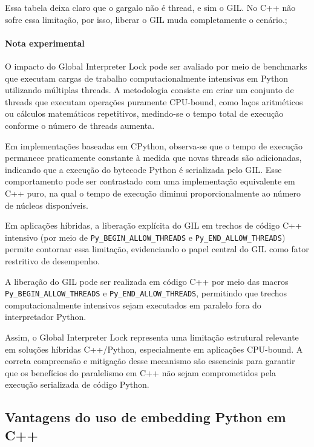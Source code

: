 Essa tabela deixa claro que o gargalo não é thread, e sim o GIL. No C++ não sofre essa limitação, por isso, liberar o GIL muda completamente o cenário.;

\paragraph{Nota experimental}

O impacto do Global Interpreter Lock pode ser avaliado por meio de benchmarks que executam cargas de trabalho computacionalmente intensivas em Python utilizando múltiplas threads. A metodologia consiste em criar um conjunto de threads que executam operações puramente CPU-bound, como laços aritméticos ou cálculos matemáticos repetitivos, medindo-se o tempo total de execução conforme o número de threads aumenta.

Em implementações baseadas em CPython, observa-se que o tempo de execução permanece praticamente constante à medida que novas threads são adicionadas, indicando que a execução do bytecode Python é serializada pelo GIL. Esse comportamento pode ser contrastado com uma implementação equivalente em C++ puro, na qual o tempo de execução diminui proporcionalmente ao número de núcleos disponíveis.

Em aplicações híbridas, a liberação explícita do GIL em trechos de código C++ intensivo (por meio de \texttt{Py\_BEGIN\_ALLOW\_THREADS} e \texttt{Py\_END\_ALLOW\_THREADS}) permite contornar essa limitação, evidenciando o papel central do GIL como fator restritivo de desempenho.

A liberação do GIL pode ser realizada em código C++ por meio das macros\\
\texttt{Py\_BEGIN\_ALLOW\_THREADS} e \texttt{Py\_END\_ALLOW\_THREADS},
permitindo que trechos computacionalmente intensivos sejam executados em paralelo fora do interpretador Python.

Assim, o Global Interpreter Lock representa uma limitação estrutural relevante em soluções híbridas C++/Python, especialmente em aplicações CPU-bound. A correta compreensão e mitigação desse mecanismo são essenciais para garantir que os benefícios do paralelismo em C++ não sejam comprometidos pela execução serializada de código Python.




\subsection{Vantagens do uso de embedding Python em C++}

